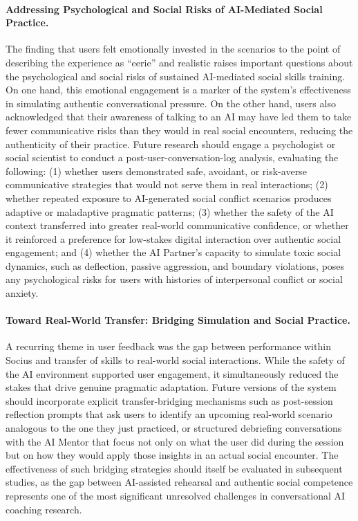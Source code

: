 \paragraph{Addressing Psychological and Social Risks of AI-Mediated Social Practice.}

The finding that users felt emotionally invested in the scenarios to the point
of describing the experience as ``eerie'' and realistic raises important
questions about the psychological and social risks of sustained AI-mediated
social skills training. On one hand, this emotional engagement is a marker of
the system's effectiveness in simulating authentic conversational pressure. On
the other hand, users also acknowledged that their awareness of talking to an AI
may have led them to take fewer communicative risks than they would in real social
encounters, reducing the authenticity of their practice. Future research should
engage a psychologist or social scientist to conduct a post-user-conversation-log
analysis, evaluating the following: (1) whether users demonstrated safe, avoidant,
or risk-averse communicative strategies that would not serve them in real
interactions; (2) whether repeated exposure to AI-generated social conflict
scenarios produces adaptive or maladaptive pragmatic patterns; (3) whether the
safety of the AI context transferred into greater real-world communicative
confidence, or whether it reinforced a preference for low-stakes digital
interaction over authentic social engagement; and (4) whether the AI Partner's
capacity to simulate toxic social dynamics, such as deflection, passive
aggression, and boundary violations, poses any psychological risks for users
with histories of interpersonal conflict or social anxiety.

\paragraph{Toward Real-World Transfer: Bridging Simulation and Social Practice.}

A recurring theme in user feedback was the gap between performance within Socius
and transfer of skills to real-world social interactions. While the safety of the
AI environment supported user engagement, it simultaneously reduced the stakes
that drive genuine pragmatic adaptation. Future versions of the system should
incorporate explicit transfer-bridging mechanisms such as post-session reflection
prompts that ask users to identify an upcoming real-world scenario analogous to
the one they just practiced, or structured debriefing conversations with the AI
Mentor that focus not only on what the user did during the session but on how
they would apply those insights in an actual social encounter. The effectiveness
of such bridging strategies should itself be evaluated in subsequent studies,
as the gap between AI-assisted rehearsal and authentic social competence
represents one of the most significant unresolved challenges in conversational AI
coaching research.